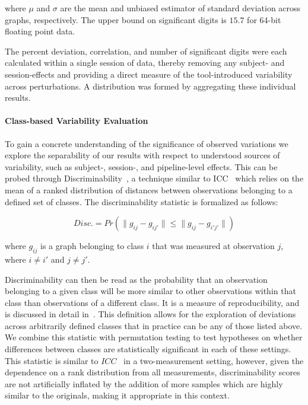 \documentclass[fleqn,10pt]{SelfArx} %
\newcommand{\new}[1]{{\color{blue} #1}}
\begin{document}
where $\mu$ and $\sigma$ are the mean and unbiased estimator of standard deviation across graphs, respectively. The
upper bound on significant digits is $15.7$ for 64-bit floating point data.

The percent deviation, correlation, and number of significant digits were each calculated within a single session of
data, thereby removing any subject- and session-effects and providing a direct measure of the tool-introduced
variability across perturbations. A distribution was formed by aggregating these individual results.

\paragraph{Class-based Variability Evaluation} To gain a concrete understanding of the significance of observed
variations we explore the separability of our results with respect to understood sources of variability, such as 
subject-, session-, and pipeline-level effects. This can be probed through Discriminability~\cite{bridgeford2020elim},
a technique similar to ICC~\cite{Bartko1966-tl} which relies on the mean of a ranked distribution of distances between
observations belonging to a defined set of classes. The discriminability statistic is formalized as follows:

\begin{equation}
Disc. = Pr(\lVert g_{ij} - g_{ij'} \rVert \leq \lVert g_{ij} - g_{i'j'} \rVert)
\label{eq:sigdig}
\end{equation}

where $g_{ij}$ is a graph belonging to class $i$ that was measured at observation $j$, where $i \neq i'$ and
$j \neq j'$.

Discriminability can then be read as the probability that an observation belonging to a given class will be more
similar to other observations within that class than observations of a different class. It is a measure of
reproducibility, and is discussed in detail in~\cite{bridgeford2020elim}. This definition allows for the exploration of
deviations across arbitrarily defined classes that in practice can be any of those listed above. We combine this
statistic with permutation testing to test hypotheses on whether differences between classes are statistically
significant in each of these settings. \new{This statistic is similar to $ICC$~\cite{Bartko1966-tl} in a two-measurement
setting, however, given the dependence on a rank distribution from all measurements, discriminability scores are not
artificially inflated by the addition of more samples which are highly similar to the originals, making it appropriate
in this context.}
\end{document}
